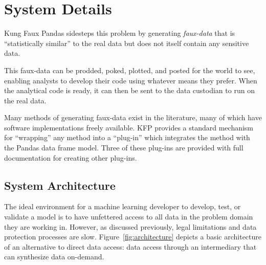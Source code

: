 \documentclass{article}
\begin{document}
\section{System Details}


Kung Faux Pandas sidesteps this problem by generating \emph{faux-data} that is ``statistically similar'' to the real data but does not itself contain any sensitive data.

This faux-data can be prodded, poked, plotted, and posted for the world to see, enabling analysts to develop their code using whatever means they prefer. When the analytical code is ready, it can then be sent to the data custodian to run on the real data.

Many methods of generating faux-data exist in the literature, many of which have software implementations freely available. KFP provides a standard mechanism for ``wrapping'' any method into a ``plug-in'' which integrates the method with the Pandas data frame model. Three of these plug-ins are provided with full documentation for creating other plug-ins.

\subsection{System Architecture}

The ideal environment for a machine learning developer to develop, test, or validate a model is to have unfettered access to all data in the problem domain they are working in. However, as discussed previously, legal limitations and data protection processes are slow. Figure~\ref{fig:architecture} depicts a basic architecture of an alternative to direct data access: data access through an intermediary that can synthesize data on-demand.
\end{document}
